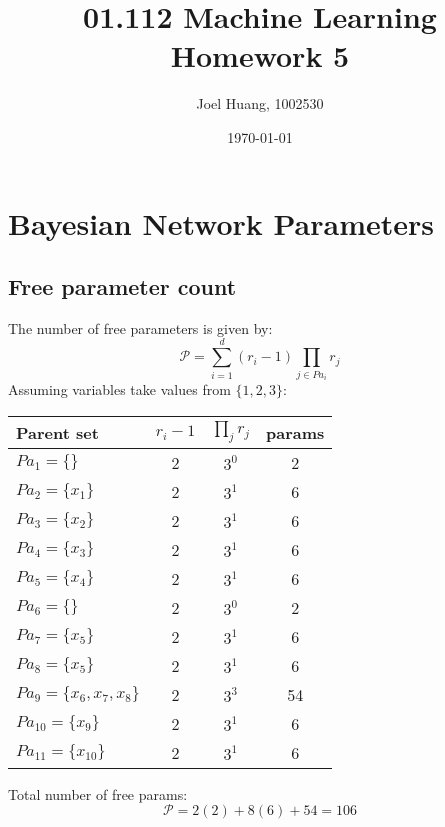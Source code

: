 \documentclass[9pt,twocolumn]{article}
\title{
    01.112 Machine Learning\\
    Homework 5
}
\author{Joel Huang, 1002530}
\date{\today}
\begin{document}
\maketitle

\section{Bayesian Network Parameters}
    \subsection{Free parameter count}
    The number of free parameters is given by:
    \begin{equation}
        \mathcal{P} = \sum_{i=1}^d (r_i-1) \prod_{j\in {Pa}_i} r_j
    \end{equation}
    Assuming variables take values from $\{1,2,3\}$:
    \begin{center}
    \begin{tabular}{|l|c|c|c|} 
    \hline
    Parent set & $r_i-1$ & $\prod_j{r_j}$ & params\\
    \hline
    $Pa_1 = \{\}$ & 2 & $3^0$ & 2\\
    $Pa_2 = \{x_1\}$ & 2 & $3^1$ & 6\\
    $Pa_3 = \{x_2\}$ & 2 & $3^1$ & 6\\
    $Pa_4 = \{x_3\}$ & 2 & $3^1$ & 6\\
    $Pa_5 = \{x_4\}$ & 2 & $3^1$ & 6\\
    $Pa_6 = \{\}$ & 2 & $3^0$ & 2\\
    $Pa_7 = \{x_5\}$ & 2 & $3^1$ & 6\\
    $Pa_8 = \{x_5\}$ & 2 & $3^1$ & 6\\
    $Pa_9 = \{x_6,x_7,x_8\}$ & 2 & $3^3$ & 54\\
    $Pa_10 = \{x_9\}$ & 2 & $3^1$ & 6\\
    $Pa_11 = \{x_{10}\}$ & 2 & $3^1$ & 6\\
    \hline
    \end{tabular}
    \end{center}
    Total number of free params:
    \begin{equation}
        \mathcal{P} = 2(2)+8(6)+54=106
    \end{equation}
\end{document}
